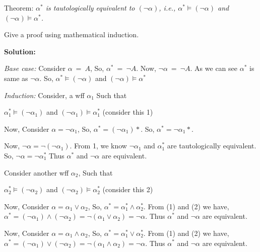 \documentclass[12pt,letterpaper]{article}
\begin{document}
\begin{enumerate}
  {\sc Theorem:}
  {\em $\alpha^*$ is tautologically equivalent to $(\neg
    \alpha)$, i.e., $\alpha^*\models (\neg\alpha)$ and 
    $(\neg\alpha)\models\alpha^*$.}

  Give a proof using mathematical induction.
  
  \textbf{Solution:}
  
  \textit{Base case:} Consider $\alpha\ =\ A$, So, $\alpha^*\ =\ \lnot A$. Now, $\lnot \alpha\ =\ \lnot A$. As we can see $\alpha^*$ is same as $\lnot \alpha$. So, $\alpha^*\models (\neg\alpha)$ and $(\neg\alpha)\models\alpha^*$
  
  \textit{Induction:} Consider, a wff $\alpha_{1}$ Such that 
  
  $\alpha_{1}^*\models (\neg\alpha_{1})$ and $(\neg\alpha_{1})\models\alpha_{1}^*$  (consider this 1)
  
  Now, Consider $\alpha = \lnot \alpha_{1}$, So, $\alpha^{*} = (\lnot \alpha_{1})*$. So, $\alpha^{*} = \lnot \alpha_{1}*$. 
  
  Now, $\lnot \alpha = \lnot(\lnot \alpha_{1})$. From 1, we know $\lnot \alpha_{1}$ and $\alpha_{1}^{*}$ are tautologically equivalent. So, $\lnot \alpha = \lnot \alpha_{1}^{*}$
  Thus $\alpha^{*}$ and $\lnot \alpha$ are equivalent.

  Consider another wff $\alpha_{2}$, Such that 
  
  $\alpha_{2}^*\models (\neg\alpha_{2})$ and $(\neg\alpha_{2})\models\alpha_{2}^*$  (consider this 2)
  
  Now, Consider $\alpha = \alpha_{1} \lor \alpha_{2}$, So, $\alpha^{*} = \alpha_{1}^{*} \land \alpha_{2}^{*}$. From (1) and (2) we have, $\alpha^{*} = (\neg\alpha_{1}) \land (\neg\alpha_{2}) = \neg( \alpha_{1} \lor \alpha_{2}) = \neg\alpha$. Thus $\alpha^{*}$ and $\lnot \alpha$ are equivalent.
  
   Now, Consider $\alpha = \alpha_{1} \land \alpha_{2}$, So, $\alpha^{*} = \alpha_{1}^{*} \lor \alpha_{2}^{*}$. From (1) and (2) we have, $\alpha^{*} = (\neg\alpha_{1}) \lor (\neg\alpha_{2}) = \neg( \alpha_{1} \land \alpha_{2}) = \neg\alpha$. Thus $\alpha^{*}$ and $\lnot \alpha$ are equivalent.
\end{enumerate}
\end{document}

